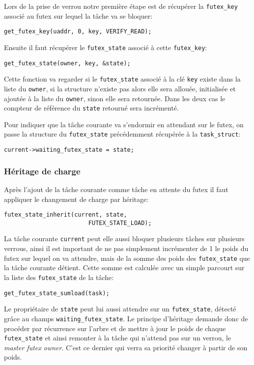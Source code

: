 Lors de la prise de verrou notre première étape est de récupérer la \verb|futex_key| 
associé au futex sur lequel la tâche va se bloquer:
\begin{lstlisting}[tabsize=4]
	get_futex_key(uaddr, 0, key, VERIFY_READ);
\end{lstlisting}
Ensuite il faut récupérer le \verb|futex_state| associé à cette \verb|futex_key|:
\begin{lstlisting}[tabsize=4]
	get_futex_state(owner, key, &state);
\end{lstlisting}

Cette fonction va regarder si le \verb|futex_state| associé à la clé \verb|key| existe
dans la liste du \verb|owner|,
si la structure n'existe pas alors elle sera allouée, initialisée et ajoutée à la liste du \verb|owner|,
sinon elle sera retournée.
Dans les deux cas le compteur de référence du \verb|state| retourné sera incrémenté.

Pour indiquer que la tâche courante va s'endormir en attendant sur le futex, on passe la structure
du \verb|futex_state| précédemment récupérée à la \verb|task_struct|:
\begin{lstlisting}[tabsize=4]
	current->waiting_futex_state = state;
\end{lstlisting}

\subsubsection{Héritage de charge}

Après l'ajout de la tâche courante comme tâche en attente du futex il faut appliquer le changement de charge
par héritage:
\begin{lstlisting}[tabsize=4]
	futex_state_inherit(current, state, 
						FUTEX_STATE_LOAD);
\end{lstlisting}

La tâche courante \verb|current| peut elle aussi bloquer plusieurs tâches sur plusieurs verrous, ainsi il est important de ne pas
simplement incrémenter de 1 le poids du futex sur lequel on va attendre, mais de la somme des poids
des \verb|futex_state| que la tâche courante détient. Cette somme est calculée avec un simple parcourt sur la
liste des \verb|futex_state| de la tâche:
\begin{lstlisting}[tabsize=4]
	get_futex_state_sumload(task);
\end{lstlisting}

Le propriétaire de \verb|state| peut lui aussi attendre sur un \verb|futex_state|,
détecté grâce au champs \verb|waiting_futex_state|. 
Le principe d'héritage demande donc
de procéder par récurrence sur l'arbre et de mettre à jour le poids de chaque \verb|futex_state|
et ainsi remonter à la tâche qui n'attend pas sur un verrou, le \textit{master futex owner}.
C'est ce dernier qui verra sa priorité changer à partir de son poids.

